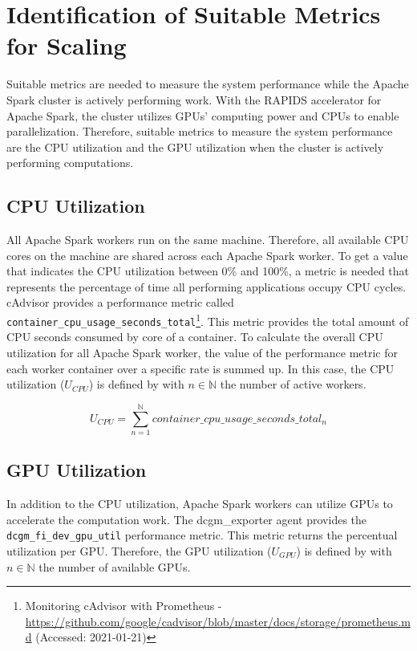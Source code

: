 \section{Identification of Suitable Metrics for Scaling}
\label{sec:05_metrics}
Suitable metrics are needed to measure the system performance while the Apache Spark cluster is actively performing work.
With the RAPIDS accelerator for Apache Spark, the cluster utilizes GPUs' computing power and CPUs to enable parallelization.
Therefore, suitable metrics to measure the system performance are the CPU utilization and the GPU utilization when the cluster is actively performing computations.


\subsection{CPU Utilization}
All Apache Spark workers run on the same machine. Therefore, all available CPU cores on the machine are shared across each Apache Spark worker.
%
To get a value that indicates the CPU utilization between 0\% and 100\%, a metric is needed that represents the percentage of time all performing applications occupy CPU cycles.
cAdvisor provides a performance metric called \texttt{container\_cpu\_usage\_seconds\_total}\footnote{Monitoring cAdvisor with Prometheus - \url{https://github.com/google/cadvisor/blob/master/docs/storage/prometheus.md} (Accessed: 2021-01-21)}. This metric provides the total amount of CPU seconds consumed by core of a container. 
To calculate the overall CPU utilization for all Apache Spark worker, the value of the performance metric for each worker container over a specific rate is summed up.
%
In this case, the CPU utilization ($U_{CPU}$) is defined by  with $n \in \mathbb{N}$ the number of active workers.

\begin{equation}
U_{CPU}=\sum_{n=1}^{\mathbb{N}}container\_cpu\_usage\_seconds\_total_{n}
\label{eq:05_metrics_cpu}
\end{equation}

\subsection{GPU Utilization}
%
In addition to the CPU utilization, Apache Spark workers can utilize GPUs to accelerate the computation work.	
The dcgm\_exporter agent provides the \texttt{dcgm\_fi\_dev\_gpu\_util} performance metric. This metric returns the percentual utilization per GPU.
Therefore, the GPU utilization ($U_{GPU}$) is defined by  with $n \in \mathbb{N}$ the number of available GPUs.


